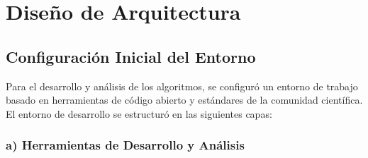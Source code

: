 \section{Diseño de Arquitectura}

\subsection{Configuración Inicial del Entorno}

Para el desarrollo y análisis de los algoritmos, se configuró un entorno de trabajo basado en herramientas de código abierto y estándares de la comunidad científica. El entorno de desarrollo se estructuró en las siguientes capas:

\subsubsection{a) Herramientas de Desarrollo y Análisis}

